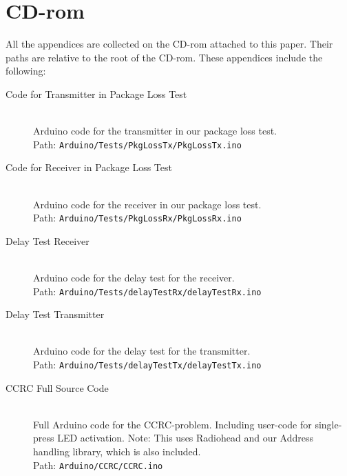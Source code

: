 \appendix

\chapter{CD-rom}\label{cdrom}
All the appendices are collected on the CD-rom attached to this paper.
Their paths are relative to the root of the CD-rom.
These appendices include the following: 

\begin{description}
\item[Code for Transmitter in Package Loss Test\label{app:PkgLossTxCode}]\hfill\\
    Arduino code for the transmitter in our package loss test.
    \\Path: \texttt{Arduino/Tests/PkgLossTx/PkgLossTx.ino}
%
    
\item[Code for Receiver in Package Loss Test\label{app:PkgLossRxCode}]\hfill\\
    Arduino code for the receiver in our package loss test.
    \\Path: \texttt{Arduino/Tests/PkgLossRx/PkgLossRx.ino}
    
\item[Delay Test Receiver\label{app:t2receiver}]\hfill\\
    Arduino code for the delay test for the receiver.
    \\Path: \texttt{Arduino/Tests/delayTestRx/delayTestRx.ino}
    
\item[Delay Test Transmitter\label{app:t2transmitter}]\hfill\\
    Arduino code for the delay test for the transmitter.
    \\Path: \texttt{Arduino/Tests/delayTestTx/delayTestTx.ino}

\item[CCRC Full Source Code \label{app:CCRC_CODE}]\hfill\\
    Full Arduino code for the CCRC-problem.
    Including user-code for single-press LED activation.
    Note: This uses Radiohead and our Address handling library, which is also included.
    \\Path: \texttt{Arduino/CCRC/CCRC.ino}
    

\end{description}
